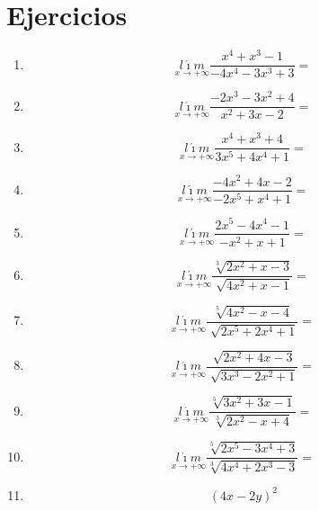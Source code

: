 \documentclass[oneside,spanish,letter]{article}
\begin{document}
\section{Ejercicios}
\begin{enumerate}
 \item $$\underset{x\rightarrow +\infty}{l\acute{\imath}m} \frac{x^4+x^3-1}{-4x^4-3x^3+3}=$$
 \item $$\underset{x\rightarrow +\infty}{l\acute{\imath}m} \frac{-2x^3-3x^2+4}{x^2+3x-2}=$$
 \item $$\underset{x\rightarrow +\infty}{l\acute{\imath}m} \frac{x^4+x^3+4}{3x^5+4x^4+1}=$$
 \item $$\underset{x\rightarrow +\infty}{l\acute{\imath}m} \frac{-4x^2+4x-2}{-2x^5+x^4+1}=$$
 \item $$\underset{x\rightarrow +\infty}{l\acute{\imath}m} \frac{2x^5-4x^4-1}{-x^2+x+1}=$$
 \item $$\underset{x\rightarrow +\infty}{l\acute{\imath}m} \frac{\sqrt[3]{2x^2+x-3}}{\sqrt[]{4x^2+x-1}}=$$
 \item $$\underset{x\rightarrow +\infty}{l\acute{\imath}m} \frac{\sqrt[5]{4x^2-x-4}}{\sqrt[]{2x^5+2x^4+1}}=$$
 \item $$\underset{x\rightarrow +\infty}{l\acute{\imath}m} \frac{\sqrt[]{2x^2+4x-3}}{\sqrt[]{3x^3-2x^2+1}}=$$
 \item $$\underset{x\rightarrow +\infty}{l\acute{\imath}m} \frac{\sqrt[5]{3x^2+3x-1}}{\sqrt[3]{2x^2-x+4}}=$$
 \item $$\underset{x\rightarrow +\infty}{l\acute{\imath}m} \frac{\sqrt[5]{2x^5-3x^4+3}}{\sqrt[3]{4x^4+2x^3-3}}=$$
\item $$(4x-2y)^2$$
 \end{enumerate}
  \newpage
\end{document}
